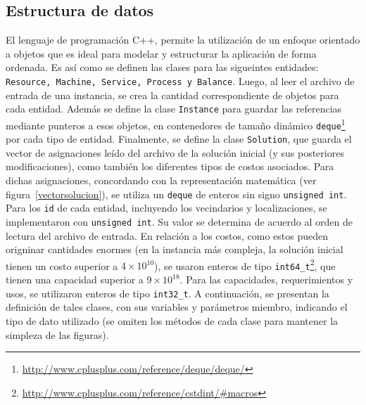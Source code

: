 \documentclass[../informe2.tex]{subfiles}
\begin{document}
\subsection{Estructura de datos}
El lenguaje de programación C++, permite la utilización de un enfoque orientado a objetos que es ideal para modelar y estructurar la aplicación de forma ordenada. Es así como se definen las clases para las sigueintes entidades: \texttt{Resource, Machine, Service, Process y Balance}. Luego, al leer el archivo de entrada de una instancia, se crea la cantidad correspondiente de objetos para cada entidad. Además se define la clase \texttt{Instance} para guardar las referencias mediante punteros a esos objetos, en contenedores de tamaño dinámico \texttt{deque}\footnote{\url{http://www.cplusplus.com/reference/deque/deque/}} por cada tipo de entidad. Finalmente, se define la clase \texttt{Solution}, que guarda el vector de asignaciones leído del archivo de la solución inicial (y sus posteriores modificaciones), como también los diferentes tipos de costos asociados. Para dichas asignaciones, concordando con la representación matemática (ver figura~\ref{vectorsolucion}), se utiliza un \texttt{deque} de enteros sin signo \texttt{unsigned int}. \\
Para los \texttt{id} de cada entidad, incluyendo los vecindarios y localizaciones, se implementaron con \texttt{unsigned int}. Su valor se determina de acuerdo al orden de lectura del archivo de entrada. En relación a los costos, como estos pueden origninar cantidades enormes (en la instancia más compleja, la solución inicial tienen un costo superior a $4\times10^{10}$), se usaron enteros de tipo \texttt{int64\_t}\footnote{\url{http://www.cplusplus.com/reference/cstdint/\#macros}}, que tienen una capacidad superior a $9\times10^{18}$. Para las capacidades, requerimientos y usos, se utilizaron enteros de tipo \texttt{int32\_t}. A continuación, se presentan la definición de tales clases, con sus variables y parámetros miembro, indicando el tipo de dato utilizado (se omiten los métodos de cada clase para mantener la simpleza de las figuras). \\
\end{document}
